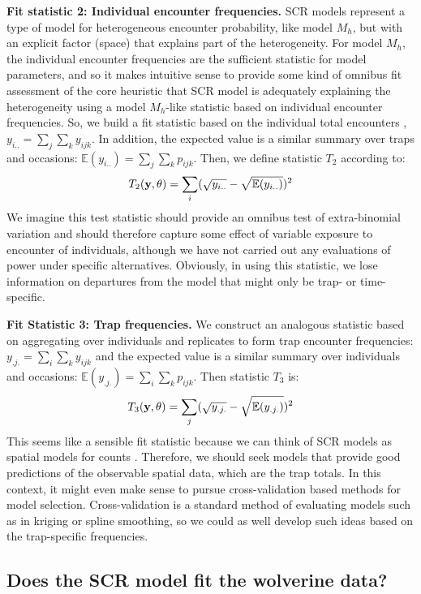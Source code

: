 {{\bf Fit statistic 2: Individual encounter frequencies. } SCR models
represent a type of model for heterogeneous encounter probability, like model $M_h$, but with an explicit
factor (space) that explains part of the heterogeneity. For model $M_h$, the
individual encounter frequencies are the sufficient statistic for
model parameters, and so it makes intuitive sense to provide some kind
of omnibus fit assessment of the core heuristic that SCR model is
adequately explaining the heterogeneity using a model $M_h$-like
statistic based on individual encounter frequencies.  So, we build a
fit statistic based on the individual total encounters
\citep{russell_etal:2012}, $y_{i..} = \sum_{j} \sum_{k} y_{ijk}$. In
addition, the expected value is a similar summary over traps and
occasions: $\mathbb{E}(y_{i..}) = \sum_{j} \sum_{k}
p_{ijk}$. Then, we define statistic $T_{2}$ according to:
\[
 T_{2}({\bf y}, \theta) = \sum_{i} (\sqrt{ y_{i..} } - \sqrt{ \mathbb{E}(y_{i..}) })^2
\]
We imagine this test statistic should provide an omnibus test of
extra-binomial variation and should therefore capture some effect of
variable exposure to encounter of individuals, although we have not
carried out any evaluations of power under specific alternatives.
Obviously, in using this statistic, we lose information on departures
from the model that might only be trap- or time-specific.


{\bf Fit Statistic 3: Trap frequencies. } We construct an analogous
statistic based on aggregating over individuals and replicates to form
trap encounter frequencies: $y_{.j.} = \sum_{i} \sum_{k} y_{ijk}$
\citep{gopalaswamy_etal:2012ecol} and the expected value is a similar
summary over individuals and occasions: $\mathbb{E}(y_{.j.}) = \sum_{i}
\sum_{k} p_{ijk}$.  Then statistic $T_{3}$ is:
\[
 T_{3}({\bf y}, \theta) = \sum_{j} (\sqrt{ y_{.j.} } - \sqrt{ \mathbb{E}(y_{.j.}) })^2
\]
This seems like a sensible fit statistic because we can think of SCR
models as 
spatial models for counts
\citep{chandler_royle:2012}. Therefore, we should seek models that
provide good predictions of the observable spatial data, which are the
trap totals.  In this context, it might even make sense to pursue
cross-validation based methods for model selection.  Cross-validation 
is a standard method of evaluating models such as in kriging or spline
smoothing, so we could as well develop such ideas based on the
trap-specific frequencies.

\subsection{Does the SCR model fit the wolverine data?}

}
